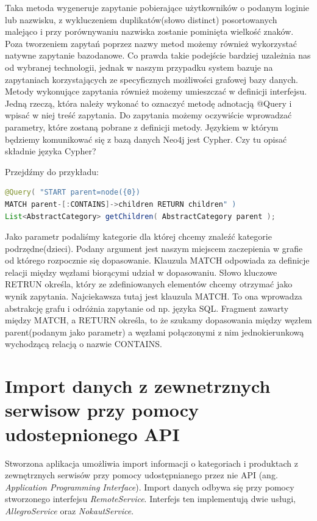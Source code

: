 Taka metoda wygeneruje zapytanie pobierające użytkowników o podanym loginie lub nazwisku, z wykluczeniem duplikatów(słowo distinct) posortowanych malejąco i przy porównywaniu nazwiska zostanie pominięta wielkość znaków. 
Poza tworzeniem zapytań poprzez nazwy metod możemy również wykorzystać natywne zapytanie bazodanowe. Co prawda takie podejście bardziej uzależnia nas od wybranej technologii, jednak w naszym przypadku system bazuje na zapytaniach korzystających ze specyficznych możliwości grafowej bazy danych. Metody wykonujące zapytania również możemy umieszczać w definicji interfejsu. Jedną rzeczą, która należy wykonać to oznaczyć metodę adnotacją @Query i wpisać w niej treść zapytania. Do zapytania możemy oczywiście wprowadzać parametry, które zostaną pobrane z definicji metody. Językiem w którym będziemy komunikować się z bazą danych Neo4j jest Cypher. 
Czy tu opisać składnie języka Cypher?

Przejdźmy do przykładu:

\begin{lstlisting}[language=Java]
@Query( "START parent=node({0}) 
MATCH parent-[:CONTAINS]->children RETURN children" )
List<AbstractCategory> getChildren( AbstractCategory parent );
\end{lstlisting}

Jako parametr podaliśmy kategorie dla której chcemy znaleźć kategorie podrzędne(dzieci). Podany argument jest naszym miejscem zaczepienia w grafie od którego rozpocznie się dopasowanie. Klauzula MATCH odpowiada za definicje relacji między węzłami biorącymi udział w dopasowaniu. Słowo kluczowe RETRUN określa, który ze zdefiniowanych elementów chcemy otrzymać jako wynik zapytania. Najciekawsza tutaj jest klauzula MATCH. To ona wprowadza abstrakcję grafu i odróżnia zapytanie od np. języka SQL. Fragment zawarty między MATCH, a RETURN określa, to że szukamy dopasowania między węzłem parent(podanym jako parametr) a węzłami połączonymi z nim  jednokierunkową wychodzącą relacją o nazwie CONTAINS. 

\section{Import danych z zewnetrznych serwisow przy pomocy udostepnionego API}

Stworzona aplikacja umożliwia import informacji o kategoriach i produktach z zewnętrznych serwisów przy pomocy udostępnianego przez nie API (ang. \textit{Application Programming Interface}). Import danych odbywa się przy pomocy stworzonego interfejsu \textit{RemoteService}. Interfejs ten implementują dwie usługi, \textit{AllegroService} oraz \textit{NokautService}.

